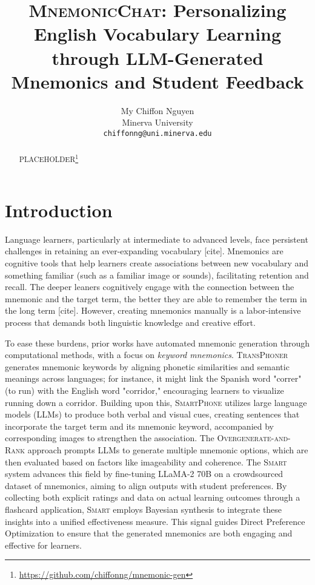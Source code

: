 \documentclass[11pt, onecolumn]{article}
\title{\textsc{MnemonicChat}: Personalizing English Vocabulary Learning through LLM-Generated Mnemonics and Student Feedback}
\author{My Chiffon Nguyen \\
  Minerva University \\
  \texttt{chiffonng@uni.minerva.edu}}
\begin{document}
\maketitle
\begin{abstract}
PLACEHOLDER\footnote{\href{https://github.com/chiffonng/mnemonic-gen}{https://github.com/chiffonng/mnemonic-gen}}
\end{abstract}

\section{Introduction}
Language learners, particularly at intermediate to advanced levels, face persistent challenges in retaining an ever-expanding vocabulary [cite]. Mnemonics are cognitive tools that help learners create associations between new vocabulary and something familiar (such as a familiar image or sounds), facilitating retention and recall. The deeper leaners cognitively engage with the connection between the mnemonic and the target term, the better they are able to remember the term in the long term [cite]. However, creating mnemonics manually is a labor-intensive process that demands both linguistic knowledge and creative effort.

To ease these burdens, prior works have automated mnemonic generation through computational methods, with a focus on \textit{keyword mnemonics}. \textsc{TransPhoner}  generates mnemonic keywords by aligning phonetic similarities and semantic meanings across languages; for instance, it might link the Spanish word "correr" (to run) with the English word "corridor," encouraging learners to visualize running down a corridor. Building upon this, \textsc{SmartPhone} utilizes large language models (LLMs) to produce both verbal and visual cues, creating sentences that incorporate the target term and its mnemonic keyword, accompanied by corresponding images to strengthen the association. The \textsc{Overgenerate-and-Rank} approach prompts LLMs to generate multiple mnemonic options, which are then evaluated based on factors like imageability and coherence. The \textsc{Smart} system advances this field by fine-tuning LLaMA-2 70B on a crowdsourced dataset of mnemonics, aiming to align outputs with student preferences. By collecting both explicit ratings and data on actual learning outcomes through a flashcard application, \textsc{Smart} employs Bayesian synthesis to integrate these insights into a unified effectiveness measure. This signal guides Direct Preference Optimization to ensure that the generated mnemonics are both engaging and effective for learners.
\end{document}

